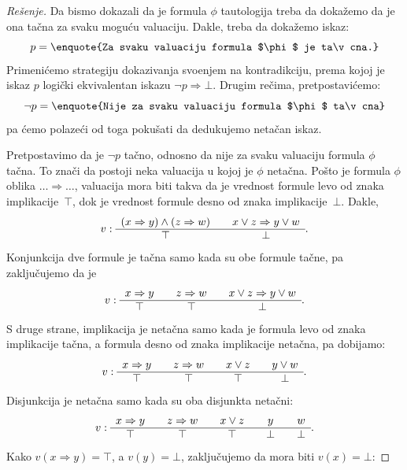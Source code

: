 \begin{proof}[Re\v senje]
  Da bismo dokazali da je formula $\phi$ tautologija treba da doka\v zemo da je ona ta\v cna za svaku mogu\'cu valuaciju.
  Dakle, treba da doka\v zemo iskaz:
  $$
    p = \text{\enquote{Za svaku valuaciju formula $\phi$ je ta\v cna.}}
  $$
  Primeni\'cemo strategiju dokazivanja svo\dj enjem na kontradikciju, prema kojoj je iskaz $p$ logi\v cki
  ekvivalentan iskazu $\lnot p \Rightarrow \bot$. Drugim re\v cima, pretpostavi\'cemo:
  $$
    \lnot p = \text{\enquote{Nije za svaku valuaciju formula $\phi$ ta\v cna}}
  $$
  pa \'cemo polaze\'ci od toga poku\v sati da dedukujemo neta\v can iskaz.
  
  Pretpostavimo da je $\lnot p$ ta\v cno, odnosno da nije za svaku valuaciju formula $\phi$ ta\v cna.
  To zna\v ci da postoji neka valuacija u kojoj je $\phi$ neta\v cna. Po\v sto je formula $\phi$
  oblika $\ldots \Rightarrow \ldots$, valuacija mora biti takva da je vrednost formule levo od znaka implikacije~$\top$,
  dok je vrednost formule desno od znaka implikacije~$\bot$. Dakle,
  $$
    v : \begin{array}{c@{\qquad}c}
      (x \Rightarrow y) \land (z \Rightarrow w) & x \lor z \Rightarrow y \lor w \\
      \hline
      \top & \bot
    \end{array}.
  $$
  Konjunkcija dve formule je ta\v cna samo kada su obe formule ta\v cne, pa zaklju\v cujemo da je
  $$
    v : \begin{array}{c@{\qquad}c@{\qquad}c}
      x \Rightarrow y & z \Rightarrow w & x \lor z \Rightarrow y \lor w \\
      \hline
      \top & \top & \bot
    \end{array}.
  $$
  S druge strane, implikacija je neta\v cna samo kada je formula levo od znaka implikacije ta\v cna, a formula desno od
  znaka implikacije neta\v cna, pa dobijamo:
  $$
    v : \begin{array}{c@{\qquad}c@{\qquad}c@{\qquad}c}
      x \Rightarrow y & z \Rightarrow w & x \lor z & y \lor w \\
      \hline
      \top & \top & \top & \bot
    \end{array}.
  $$
  Disjunkcija je neta\v cna samo kada su oba disjunkta neta\v cni:
  $$
    v : \begin{array}{c@{\qquad}c@{\qquad}c@{\qquad}c@{\qquad}c}
      x \Rightarrow y & z \Rightarrow w & x \lor z & y & w \\
      \hline
      \top & \top & \top & \bot & \bot
    \end{array}.
  $$
  Kako $v(x \Rightarrow y) = \top$, a $v(y) = \bot$, zaklju\v cujemo da mora biti $v(x) = \bot$:

\end{proof}
